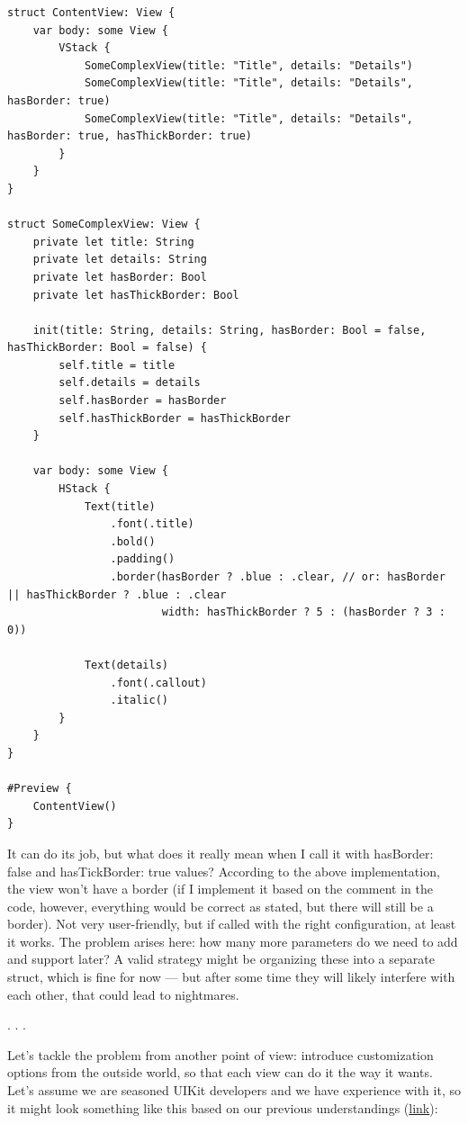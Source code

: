 \documentclass{article}
\newcommand{\separator}{\vspace{5mm}\centerline{. . .}\vspace{5mm}}
\begin{document}
\begin{lstlisting}
struct ContentView: View {
    var body: some View {
        VStack {
            SomeComplexView(title: "Title", details: "Details")
            SomeComplexView(title: "Title", details: "Details", hasBorder: true)
            SomeComplexView(title: "Title", details: "Details", hasBorder: true, hasThickBorder: true)
        }
    }
}

struct SomeComplexView: View {
    private let title: String
    private let details: String
    private let hasBorder: Bool
    private let hasThickBorder: Bool

    init(title: String, details: String, hasBorder: Bool = false, hasThickBorder: Bool = false) {
        self.title = title
        self.details = details
        self.hasBorder = hasBorder
        self.hasThickBorder = hasThickBorder
    }

    var body: some View {
        HStack {
            Text(title)
                .font(.title)
                .bold()
                .padding()
                .border(hasBorder ? .blue : .clear, // or: hasBorder || hasThickBorder ? .blue : .clear
                        width: hasThickBorder ? 5 : (hasBorder ? 3 : 0))

            Text(details)
                .font(.callout)
                .italic()
        }
    }
}

#Preview {
    ContentView()
}
\end{lstlisting}

It can do its job, but what does it really mean when I call it with hasBorder: false and hasTickBorder: true values? According to the above implementation, the view won’t have a border (if I implement it based on the comment in the code, however, everything would be correct as stated, but there will still be a border). Not very user-friendly, but if called with the right configuration, at least it works. The problem arises here: how many more parameters do we need to add and support later? A valid strategy might be organizing these into a separate struct, which is fine for now — but after some time they will likely interfere with each other, that could lead to nightmares.

\separator

Let’s tackle the problem from another point of view: introduce customization options from the outside world, so that each view can do it the way it wants. Let's assume we are seasoned UIKit developers and we have experience with it, so it might look something like this based on our previous understandings (\href{https://github.com/stateman92/Medium-ViewModifier/commit/389cc8f8aa83bc53f579c6b00f77be8325cc4c6b}{link}):
\end{document}
